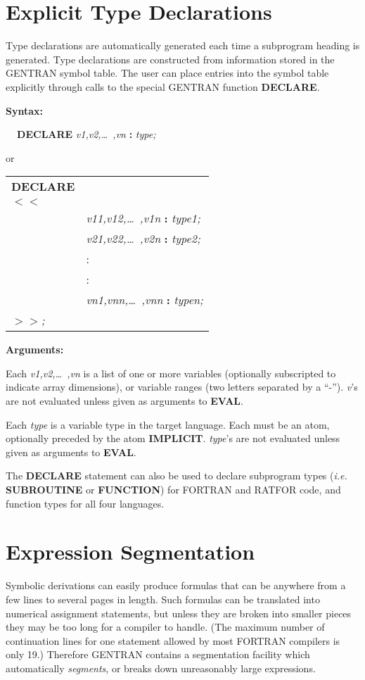 \documentclass[11pt,letterpaper]{book}
\newenvironment{describe}[1]{\par{\bf #1}\begin{indented}}{\end{indented}}
\begin{document}
\section{Explicit Type Declarations}
\label{explicit:type}
Type declarations are automatically generated each time a subprogram
heading is generated.  Type declarations are constructed
from information stored in the GENTRAN symbol table.  The user
can place entries into the symbol table explicitly through calls
to the special GENTRAN function {\bf DECLARE}.
\begin{describe}{Syntax:}
{\bf \ \ DECLARE} {\it v1,v2,\dots\  ,vn} {\bf :} {\it type;}

    or

\begin{tabular}{ll}
{\bf DECLARE}\\
{\bf $<$$<$}\\
&{\it v11,v12,\dots\  ,v1n} {\bf :} {\it type1;}\\
&{\it v21,v22,\dots\  ,v2n} {\bf :} {\it type2;}\\
& :\\
& :\\
&{\it vn1,vnn,\dots\  ,vnn} {\bf :} {\it typen;}\\
{\bf $>$$>$}{\it ;}
\end{tabular}
\end{describe}
\begin{describe}{Arguments:}
Each {\it v1,v2,\dots\  ,vn} is a list of one or more variables
(optionally subscripted to indicate array dimensions), or
variable ranges (two letters separated by a ``-'').  {\it v}'s are
not evaluated unless given as arguments to {\bf EVAL}.

Each {\it type} is a variable type in the target language.  Each
must be an atom, optionally preceded by the atom {\bf IMPLICIT}.
{\it type}'s are not evaluated unless given as arguments to {\bf EVAL}.
\end{describe}

The {\bf DECLARE} statement can also be used to declare subprogram
types ({\em i.e.\ } {\bf SUBROUTINE} or {\bf FUNCTION}) for
 FORTRAN and RATFOR code, and
function types for all four languages.

\section{Expression Segmentation}
\label{segmentation}
Symbolic derivations can easily produce formulas that can be anywhere
from a few lines to several pages in length.  Such formulas
can be translated into numerical assignment statements, but unless they
are broken into smaller pieces they may be too long for a compiler
to handle.  (The maximum number of continuation lines for one statement
allowed by most FORTRAN compilers is only 19.)  Therefore GENTRAN
contains a segmentation facility which automatically {\it segments},
or breaks down unreasonably large expressions.
\end{document}
